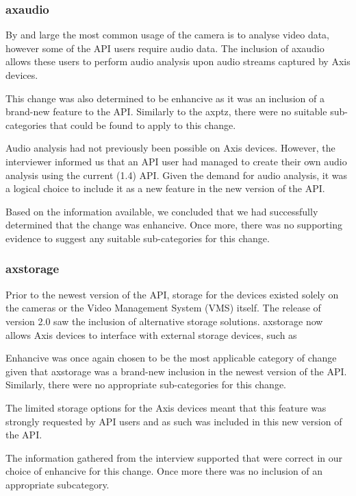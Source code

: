 \documentclass{sig-alternate}
\begin{document}
\subsubsection{axaudio}

By and large the most common usage of the camera is to analyse video data, however some of the API users require audio data. The inclusion of axaudio allows these users to perform audio analysis upon audio streams captured by Axis devices. 

This change was also determined to be enhancive as it was an inclusion of a brand-new feature to the API. Similarly to the axptz, there were no suitable sub-categories that could be found to apply to this change.

Audio analysis had not previously been possible on Axis devices. However, the interviewer informed us that an API user had managed to create their own audio analysis using the current (1.4) API. Given the demand for audio analysis, it was a logical choice to include it as a new feature in the new version of the API.

Based on the information available, we concluded that we had successfully determined that the change was enhancive. Once more, there was no supporting evidence to suggest any suitable sub-categories for this change.

\subsubsection{axstorage}

Prior to the newest version of the API, storage for the devices existed solely on the cameras or the Video Management System (VMS) itself. The release of version 2.0 saw the inclusion of alternative storage solutions. axstorage now allows Axis devices to interface with external storage devices, such as     

Enhancive was once again chosen to be the most applicable category of change given that axstorage was a brand-new inclusion in the newest version of the API. Similarly, there were no appropriate sub-categories for this change.

The limited storage options for the Axis devices meant that this feature was strongly requested by API users and as such was included in this new version of the API.

The information gathered from the interview supported that were correct in our choice of enhancive for this change. Once more there was no inclusion of an appropriate subcategory.
\end{document}
